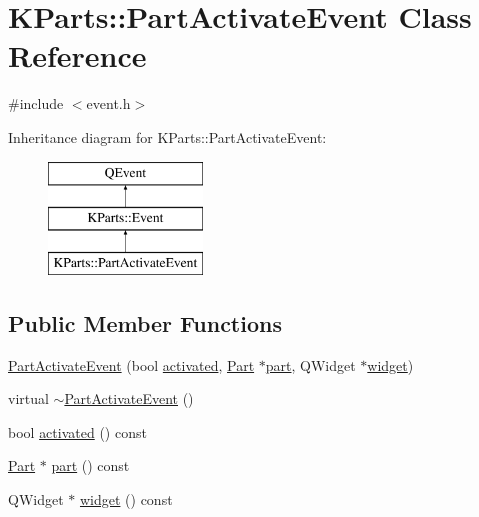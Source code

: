\hypertarget{classKParts_1_1PartActivateEvent}{\section{K\+Parts\+:\+:Part\+Activate\+Event Class Reference}
\label{classKParts_1_1PartActivateEvent}
}


{\ttfamily \#include $<$event.\+h$>$}

Inheritance diagram for K\+Parts\+:\+:Part\+Activate\+Event\+:\begin{figure}[H]
\begin{center}
\leavevmode
\includegraphics[height=3.000000cm]{classKParts_1_1PartActivateEvent}
\end{center}
\end{figure}
\subsection*{Public Member Functions}
\begin{DoxyCompactItemize}
\item 
\hyperlink{classKParts_1_1PartActivateEvent_a6b2b2b39fc6e8518b74e74f0f5f3947d}{Part\+Activate\+Event} (bool \hyperlink{classKParts_1_1PartActivateEvent_a7d6c164caa76842171eed19df734715b}{activated}, \hyperlink{classKParts_1_1Part}{Part} $\ast$\hyperlink{classKParts_1_1PartActivateEvent_a5588cf3b52a16cc65586a3faf6523117}{part}, Q\+Widget $\ast$\hyperlink{classKParts_1_1PartActivateEvent_ae3ec0f57c3c257eb13e4cf8c5d551f81}{widget})
\item 
virtual \hyperlink{classKParts_1_1PartActivateEvent_a070038fad91c9494c6ef4dfd00401f62}{$\sim$\+Part\+Activate\+Event} ()
\item 
bool \hyperlink{classKParts_1_1PartActivateEvent_a7d6c164caa76842171eed19df734715b}{activated} () const 
\item 
\hyperlink{classKParts_1_1Part}{Part} $\ast$ \hyperlink{classKParts_1_1PartActivateEvent_a5588cf3b52a16cc65586a3faf6523117}{part} () const 
\item 
Q\+Widget $\ast$ \hyperlink{classKParts_1_1PartActivateEvent_ae3ec0f57c3c257eb13e4cf8c5d551f81}{widget} () const 
\end{DoxyCompactItemize}
